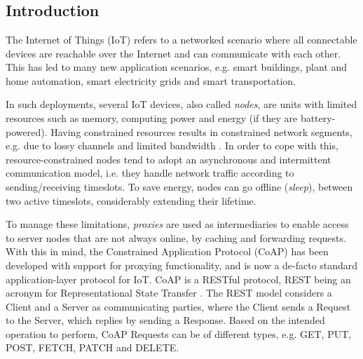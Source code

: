 \chapter[\paperIIItitle]{\texorpdfstring{%
                \paperIIItitle}{%
                \paperIIItitle}}


{

\section{Introduction}
\label{s:introduction}

The Internet of Things (IoT) refers to a networked scenario where all connectable devices are reachable over the Internet and can communicate with each other. This has led to many new application scenarios, e.g. smart buildings, plant and home automation, smart electricity grids and smart transportation.

In such deployments, several IoT devices, also called \emph{nodes}, are units with limited resources such as memory, computing power and energy (if they are battery-powered). Having constrained resources results in constrained network segments, e.g. due to lossy channels and limited bandwidth \cite{rfc7228}. In order to cope with this, resource-constrained nodes tend to adopt an asynchronous and intermittent communication model, i.e. they handle network traffic according to sending/receiving timeslots. To save energy, nodes can go offline (\emph{sleep}), between two active timeslots, considerably extending their lifetime.

To manage these limitations, \emph{proxies} are used as intermediaries to enable access to server nodes that are not always online, by caching and forwarding requests.  With this in mind, the Constrained Application Protocol (CoAP) \cite{rfc7252} has been developed with support for proxying functionality, and is now a de-facto standard application-layer protocol for IoT. CoAP is a RESTful protocol, REST being an acronym for Representational State Transfer \cite{fielding2000architectural}. The REST model considers a Client and a Server as communicating parties, where the Client sends a Request to the Server, which replies by sending a Response. Based on the intended operation to perform, CoAP Requests can be of different types, e.g. GET, PUT, POST, FETCH, PATCH and DELETE.

}
